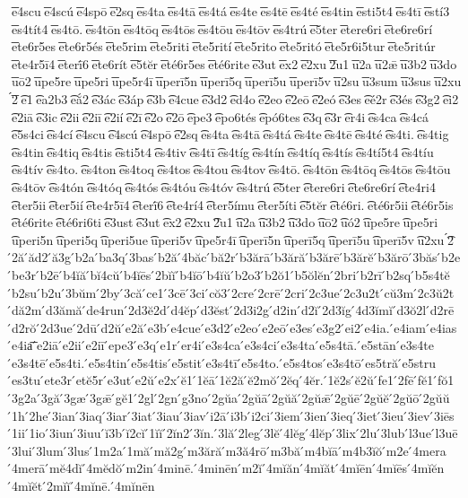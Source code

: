 {͞e4scu
͞e4scú
͞e4spō
͞e2sq
͞es4ta
͞es4tā
͞es4tá
͞es4te
͞es4tē
͞es4té
͞es4tin
͞esti5t4
͞es4tī
͞estí3
͞es4tít4
͞es4tō.
͞es4tōn
͞es4tōq
͞es4tōs
͞es4tōu
͞es4tōv
͞es4trú
͞e5ter
͞etere6ri
͞ete6re6rí
͞ete6r5es
͞ete6r5és
͞ete5rim
͞ete5riti
͞ete5rití
͞ete5rito
͞ete5ritó
͞ete5r6i5tur
͞ete5ritúr
͞ete4r5ī4
͞eterī́6
͞ete6rít
͞e5tĕr
͞eté6r5es
͞eté6rite
͞e3ut
͞ex2
͞e2xu
͞2u1
͞u2a
͞u2ǣ
͞u3b2
͞u3do
͞uō2
͞upe5re
͞upe5ri
͞upe5r4ī
͞uperī5n
͞uperī5q
͞uperī5u
͞uperī5v
͞u2su
͞u3sum
͞u3sus
͞u2xu
́͞2
͡e1
͡ea2b3
͡eắ2
͡e3ác
͡e3áp
͡e3b
͡e4cue
͡e3d2
͡ed4o
͡e2eo
͡e2eō
͡e2eó
͡e3es
͡eé2r
͡e3és
͡e3g2
͡ei2
͡e2iā
͡e3ic
͡e2ii
͡e2iī
͡e2ií
͡e2ī
͡e2o
͡e2ō
͡epe3
͡epo6tés
͡epó6tes
͡e3q
͡e3r
͡er4i
͡es4ca
͡es4cá
͡e5s4ci
͡es4cí
͡e4scu
͡e4scú
͡e4spō
͡e2sq
͡es4ta
͡es4tā
͡es4tá
͡es4te
͡es4tē
͡es4té
͡es4ti.
͡es4tig
͡es4tin
͡es4tiq
͡es4tis
͡esti5t4
͡es4tiv
͡es4tī
͡es4tíg
͡es4tín
͡es4tíq
͡es4tís
͡es4tí5t4
͡es4tíu
͡es4tív
͡es4to.
͡es4ton
͡es4toq
͡es4tos
͡es4tou
͡es4tov
͡es4tō.
͡es4tōn
͡es4tōq
͡es4tōs
͡es4tōu
͡es4tōv
͡es4tón
͡es4tóq
͡es4tós
͡es4tóu
͡es4tóv
͡es4trú
͡e5ter
͡etere6ri
͡ete6re6rí
͡ete4ri4
͡eter5ii
͡eter5ií
͡ete4r5ī4
͡eterī́6
͡ete4rí4
͡eter5ímu
͡eter5íti
͡e5tĕr
͡eté6ri.
͡eté6r5ii
͡eté6r5is
͡eté6rite
͡eté6ri6ti
͡e3ust
͡e3ut
͡ex2
͡e2xu
͡2u1
͡u2a
͡u3b2
͡u3do
͡uō2
͡uó2
͡upe5re
͡upe5ri
͡uperi5n
͡uperi5q
͡uperi5ue
͡uperi5v
͡upe5r4ī
͡uperī5n
͡uperī5q
͡uperī5u
͡uperī5v
͡u2xu
́͡2
́2ă
́ăd2
́ă3g
́b2a
́ba3q
́3bas
́b2ă
́4băc
́bă2r
́b3ărā
́b3ără
́b3ărē
́b3ărĕ
́b3ărō
́3băs
́b2e
́be3r
́b2ē
́b4ĭă
́bĭ4cŭ
́b4ĭēs
́2bĭĭ
́b4ĭō
́b4ĭŭ
́b2o3
́b2ŏ1
́b5ŏlĕn
́2bri
́b2rī
́b2sq
́b5s4tĕ
́b2su
́b2u
́3bŭm
́2by
́3că
́ce1
́3cē
́3ci
́cŏ3
́2cre
́2crē
́2cri
́2c3ue
́2c3u2t
́cŭ3m
́2c3ŭ2t
́dă2m
́d3ămă
́de4run
́2d3ĕ2d
́d4ĕp
́d3ĕst
́2d3i2g
́d2in
́d2ĭ
́2d3ĭg
́4d3ĭmĭ
́d3ŏ2l
́d2rē
́d2rŏ
́2d3ue
́2dū
́d2ŭ
́e2ă
́e3b
́e4cue
́e3d2
́e2eo
́e2eō
́e3es
́e3g2
́ei2
́e4ia.
́e4iam
́e4ias
́e4ia͞
́e2iā
́e2ii
́e2iī
́epe3
́e3q
́e1r
́er4i
́e3s4ca
́e3s4ci
́e3s4ta
́e5s4tā.
́e5stān
́e3s4te
́e3s4tē
́e5s4ti.
́e5s4tin
́e5s4tis
́e5stit
́e3s4tī
́e5s4to.
́e5s4tos
́e3s4tō
́es5tră
́e5stru
́es3tu
́ete3r
́etĕ5r
́e3ut
́e2ŭ
́e2x
́ĕ1
́1ĕā
́1ĕ2ă
́ĕ2mŏ
́2ĕq
́4ĕr.
́1ĕ2s
́ĕ2ŭ
́fe1
́2fē
́fĕ1
́fŏ1
́3g2a
́3gă
́3gæ
́3gǣ
́gĕ1
́2gl
́2gn
́g3no
́2gŭa
́2gŭā
́2gŭă
́2gŭǣ
́2gŭē
́2gŭĕ
́2gŭō
́2gŭŭ
́1h
́2he
́3ian
́3iaq
́3iar
́3iat
́3iau
́3iav
́i2ā
́i3b
́i2ci
́3iem
́3ien
́3ieq
́3iet
́3ieu
́3iev
́3iēs
́1ii
́1io
́3iun
́3iuu
́ĭ3b
́ĭ2cĭ
́1ĭĭ
́2ĭn2
́3ĭn.
́3lă
́2leg
́3lĕ
́4lĕg
́4lĕp
́3lix
́2lu
́3lub
́l3ue
́l3uē
́3lui
́3lum
́3lus
́1m2a
́1mă
́mă2g
́m3ără
́m3ă4rō
́m3bă
́m4bĭā
́m4b3ĭŏ
́m2e
́4mera
́4merā
́mĕ4dĭ
́4mĕdŏ
́m2in
́4minē.
́4minēn
́m2ĭ
́4mĭăn
́4mĭăt
́4mĭēn
́4mĭēs
́4mĭĕn
́4mĭĕt
́2mĭĭ
́4mĭnē.
́4mĭnēn
}
